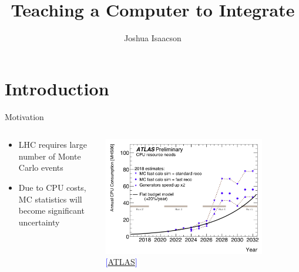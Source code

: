 \documentclass{beamer}
\title[Teaching a Computer to Integrate]{Teaching a Computer to Integrate}
\subtitle{}
\author[J. Isaacson]{Joshua Isaacson}
\institute{Fermilab}
\newcommand\reference[1]{%
{\tiny \textcolor{blue}{[#1]}}
}
\begin{document}
{
\frame{\titlepage}
}
\addtocounter{framenumber}{-1}

\section{Introduction}

\begin{frame}{Motivation}
\begin{columns}
\begin{column}{4cm}
\begin{itemize}
    \small
    \item LHC requires large number of Monte Carlo events
    \item Due to CPU costs, MC statistics will become significant uncertainty
\end{itemize}
\end{column}
\begin{column}{9cm}
\begin{center}
\includegraphics[width=0.8\textwidth]{figs/cpuHLLHC_noold.png} \\
\reference{\href{https://twiki.cern.ch/twiki/bin/view/AtlasPublic/ComputingandSoftwarePublicResults}{ATLAS}}
\end{center}
\end{column}
\end{columns}
\end{frame}
\end{document}
